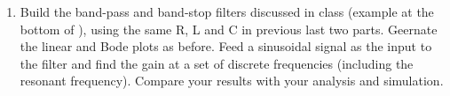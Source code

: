 \begin{enumerate}
  {\bf Solution:} Use $R=280\,\Omega$, $\zeta=(R_L+R)\sqrt{C/L}/2=0.708$



\item Build the band-pass and band-stop filters discussed in class 
  (example at the bottom of ),
  using the same R, L and C in previous last two parts. Geernate the linear and Bode plots 
  as before. Feed a sinusoidal signal as the input to the filter and find the gain at a
  set of discrete frequencies (including the resonant frequency). Compare your results 
  with your analysis and simulation.


\end{enumerate}

  

